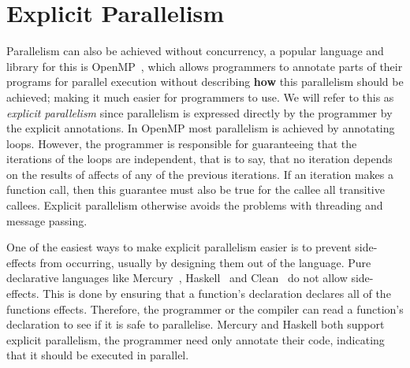 \section{Explicit Parallelism}
\label{sec:intro_explicit_par}

Parallelism can also be achieved without concurrency,
a popular language and library for this is OpenMP~\citep{openmp},
which allows programmers to annotate parts of their programs for parallel
execution without describing \textbf{how} this parallelism should be achieved;
making it much easier for programmers to use.
We will refer to this as \emph{explicit parallelism}
since parallelism is expressed directly by the programmer by the explicit
annotations.
In OpenMP most parallelism is achieved by annotating loops.
However,
the programmer is responsible for guaranteeing that the iterations of the loops
are independent,
that is to say, that no iteration depends on the results of affects of any of
the previous iterations.
If an iteration makes a function call, then this guarantee must also be true for
the callee all transitive callees.
Explicit parallelism otherwise avoids the problems with threading and message
passing.

One of the easiest ways to make explicit parallelism easier is to prevent
side-effects from occurring, usually by designing them out of the language.
Pure declarative languages like Mercury~\citep{mercury_jlp},
Haskell~\citep{haskell98} and Clean~\citep{1991:concurrent-clean} do not
allow side-effects.
This is done by ensuring that a function's declaration declares all of the
functions effects.
Therefore,
the programmer or the compiler can read a function's declaration to see if it
is safe to parallelise.
Mercury and Haskell both support explicit parallelism,
the programmer need only annotate their code, indicating that it should be
executed in parallel.

